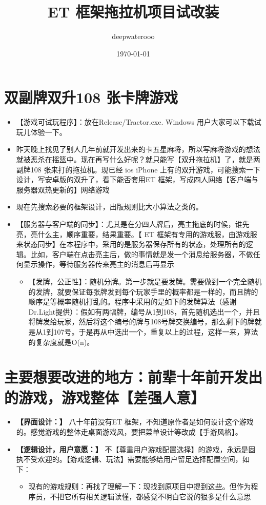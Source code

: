 \documentclass[9pt, b5paper]{article}
\author{deepwaterooo}
\date{\today}
\title{ET 框架拖拉机项目试改装}
\begin{document}
\maketitle
\tableofcontents


\section{双副牌双升108 张卡牌游戏}
\label{sec-1}
\begin{itemize}
\item 【游戏可试玩程序】：放在Release/Tractor.exe. Windows 用户大家可以下载试玩儿体验一下。
\item 昨天晚上找见了别人几年前就开发出来的卡五星麻将，所以写麻将游戏的想法就被恶杀在摇篮中。现在再写什么好呢？就只能写【双升拖拉机】了，就是两副牌108 张来打的拖拉机。现已经 ios iPhone 上有的双升游戏，可能搜索一下设计，写安卓版的双升了，看下能否套用ET 框架，写成四人网络【客户端与服务器双热更新的】网络游戏
\item 现在先搜索必要的框架设计，出版规则比大小算法之类的。
\item 【服务器与客户端的同步】：尤其是在分四人牌后，亮主拖底的时候，谁先亮，亮什么主，顺序重要，结果重要。【 ET 框架有专用的游戏服，由游戏服来状态同步】在本程序中，采用的是服务器保存所有的状态，处理所有的逻辑。比如，客户端在点击亮主后，做的事情就是发一个消息给服务器，不做任何显示操作，等待服务器传来亮主的消息后再显示
\begin{itemize}
\item 【发牌，公正性】：随机分牌。第一步就是要发牌。需要做到一个完全随机的发牌，就要保证每张牌发到每个玩家手里的概率都是一样的，而且牌的顺序是等概率随机打乱的。程序中采用的是如下的发牌算法（感谢Dr.Light提供）：假如有两幅牌，编号从1到108，首先随机选出一个，并且将牌发给玩家，然后将这个编号的牌与108号牌交换编号，那么剩下的牌就是从1到107号。于是再从中选出一个，重复以上的过程，这样一来，算法的复杂度就是O(n)。
\end{itemize}
\end{itemize}
\section{主要想要改进的地方：前辈十年前开发出的游戏，游戏整体【差强人意】}
\label{sec-2}
\begin{itemize}
\item \textbf{【界面设计：】} 八十年前没有ET 框架，不知道原作者是如何设计这个游戏的。感觉游戏的整体走桌面游戏风，要把菜单设计等改成【手游风格】。
\item \textbf{【逻辑设计，用户意愿：】} 不【尊重用户游戏配置选择】的游戏，永远是固执不受欢迎的。【游戏逻辑、玩法】需要能够给用户留足选择配置空间，如下：
\begin{itemize}
\item 现有的游戏规则：再找了理解一下：现找到原项目中提到这些。但作为程序员，不把它所有相关逻辑读懂，都感觉不明白它说的狠多是什么意思
\end{itemize}
\end{itemize}
\end{document}
